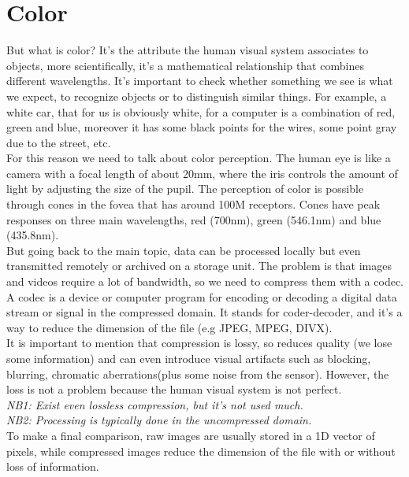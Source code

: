 \section{Color}
But what is color? It's the attribute the human visual system associates to objects, more scientifically, it's a mathematical relationship that combines different wavelengths. 
It's important to check whether something we see is what we expect, to recognize objects or to distinguish similar things. For example, a white car, that for us is obviously white, for a computer is a combination of red, green and blue, moreover it has some black points for the wires, some point gray due to the street, etc.
\\For this reason we need to talk about color perception. The human eye is like a camera with a focal length of about 20mm, where the iris controls the amount of light by adjusting the size of the pupil. 
The perception of color is possible through cones in the fovea that has around 100M receptors.  Cones have peak responses on three main wavelengths, red (700nm), green (546.1nm) and blue (435.8nm).
\\
But going back to the main topic, data can be processed locally but even transmitted remotely or archived on a storage unit. The problem is that images and videos require a lot of bandwidth, so we need to compress them with a codec.
A codec is a device or computer program for encoding or decoding a digital data stream or signal in the compressed domain. It stands for coder-decoder, and it's a way to reduce the dimension of the file (e.g JPEG, MPEG, DIVX). 
\\It is important to mention that compression is lossy, so reduces quality (we lose some information) and can even introduce visual artifacts such as blocking, blurring, chromatic aberrations(plus some noise from the sensor). However, the loss is not a problem because the human visual system is not perfect.
\\\textit{NB1: Exist even lossless compression, but it's not used much.
\\NB2: Processing is typically done in the uncompressed domain.}
\\To make a final comparison, raw images are usually stored in a 1D vector of pixels, while compressed images reduce the dimension of the file with or without loss of information.

